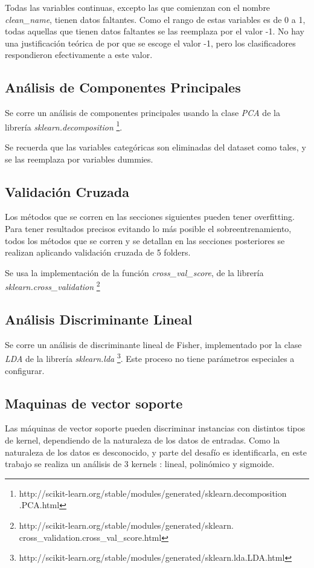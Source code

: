\documentclass[journal]{IEEEtran}
\begin{document}
Todas las variables continuas, excepto las que comienzan con el
nombre \textit{clean\_name}, tienen datos faltantes. Como el rango
de estas variables es de 0 a 1, todas aquellas que tienen datos
faltantes se las reemplaza por el valor -1. No hay una justificación
teórica de por que se escoge el valor -1, pero los clasificadores
respondieron efectivamente a este valor.

\subsection{Análisis de Componentes Principales}
Se corre un análisis de componentes principales usando la clase
\textit{PCA} de la librería \textit{sklearn.decomposition}
\footnote{http://scikit-learn.org/stable/modules/generated/sklearn.decomposition
.PCA.html}. 

Se recuerda que las 
variables categóricas son eliminadas del dataset como tales, y se las
reemplaza por variables dummies.


\subsection{Validación Cruzada}
Los métodos que se corren en las secciones siguientes pueden tener overfitting. Para
tener resultados precisos evitando lo más posible el sobreentrenamiento, todos los
métodos que se corren y se detallan en las secciones posteriores se realizan
aplicando validación cruzada de 5 folders.

Se usa la implementación de la función \textit{cross\_val\_score}, de la librería
\textit{sklearn.cross\_validation}
\footnote{http://scikit-learn.org/stable/modules/generated/sklearn.
cross\_validation.cross\_val\_score.html}

\subsection{Análisis Discriminante Lineal}
Se corre un análisis de discriminante lineal de Fisher, implementado por la clase
\textit{LDA} de la librería \textit{sklearn.lda}
\footnote{http://scikit-learn.org/stable/modules/generated/sklearn.lda.LDA.html}. Este proceso no 
tiene parámetros especiales a configurar. 

\subsection{Maquinas de vector soporte}
Las máquinas de vector soporte pueden discriminar instancias con distintos
tipos de kernel, dependiendo de la naturaleza de los datos de entradas. Como
la naturaleza de los datos es desconocido, y parte del desafío es identificarla,
en este trabajo se realiza un análisis de 3 kernels : lineal,
polinómico y sigmoide.
\end{document}
